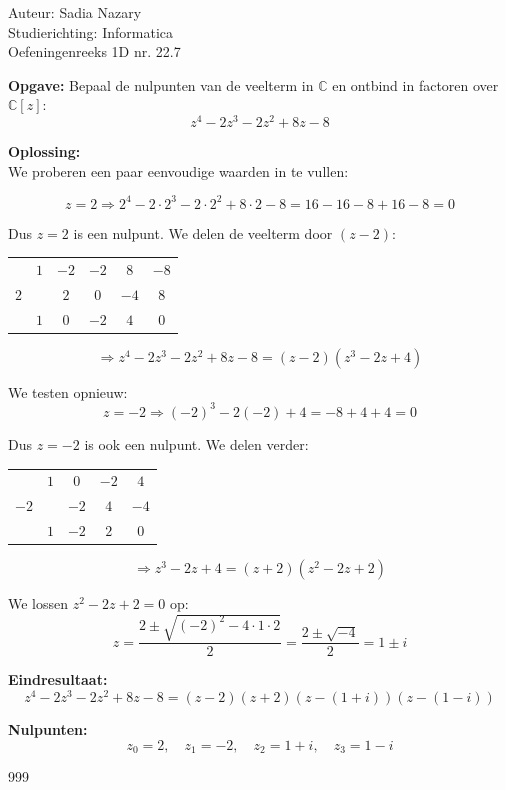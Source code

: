 \documentclass[a4paper]{article}
\begin{document}
  
\noindent \large Auteur: Sadia Nazary  \\
\noindent \large Studierichting: Informatica\\
\noindent \large Oefeningenreeks 1D nr. 22.7\\

\medskip

\normalsize

\textbf{Opgave:} Bepaal de nulpunten van de veelterm in $\mathbb{C}$ en ontbind in factoren over $\mathbb{C}[z]$: 
\[
z^4 - 2z^3 - 2z^2 + 8z - 8
\]

\textbf{Oplossing:}\\

We proberen een paar eenvoudige waarden in te vullen:

\[
z = 2 \Rightarrow 2^4 - 2 \cdot 2^3 - 2 \cdot 2^2 + 8 \cdot 2 - 8 = 16 - 16 - 8 + 16 - 8 = 0
\]

Dus $z = 2$ is een nulpunt. We delen de veelterm door $(z - 2)$:\\

\begin{tabular}{c|ccccc}
       & $1$ & $-2$ & $-2$ & $8$ & $-8$ \\
$2$    &     & $2$  & $0$  & $-4$ & $8$ \\ \hline
       & $1$ & $0$  & $-2$ & $4$ & $0$
\end{tabular}

\[
\Rightarrow z^4 - 2z^3 - 2z^2 + 8z - 8 = (z - 2)(z^3 - 2z + 4)
\]

We testen opnieuw:\\

\[
z = -2 \Rightarrow (-2)^3 - 2(-2) + 4 = -8 + 4 + 4 = 0
\]

Dus $z = -2$ is ook een nulpunt. We delen verder:\\

\begin{tabular}{c|cccc}
       & $1$ & $0$ & $-2$ & $4$ \\
$-2$   &     & $-2$ & $4$ & $-4$ \\ \hline
       & $1$ & $-2$ & $2$ & $0$
\end{tabular}

\[
\Rightarrow z^3 - 2z + 4 = (z + 2)(z^2 - 2z + 2)
\]

We lossen $z^2 - 2z + 2 = 0$ op:\\

\[
z = \frac{2 \pm \sqrt{(-2)^2 - 4 \cdot 1 \cdot 2}}{2} = \frac{2 \pm \sqrt{-4}}{2} = 1 \pm i
\]

\textbf{Eindresultaat:}\\

\[
z^4 - 2z^3 - 2z^2 + 8z - 8 = (z - 2)(z + 2)(z - (1 + i))(z - (1 - i))
\]

\textbf{Nulpunten:} \\

\[
z_0 = 2, \quad z_1 = -2, \quad z_2 = 1 + i, \quad z_3 = 1 - i
\]

\begin{thebibliography}{999}
\end{thebibliography}
\end{document}
